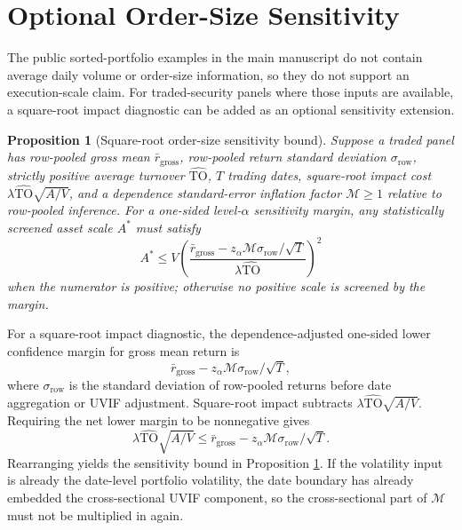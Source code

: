 \documentclass[12pt,a4paper]{article}
\newtheorem{proposition}{Proposition}
\begin{document}
\section{Optional Order-Size Sensitivity}

The public sorted-portfolio examples in the main manuscript do not
contain average daily volume or order-size information, so they do not
support an execution-scale claim.  For traded-security panels where those inputs
are available, a square-root impact diagnostic can be added as an
optional sensitivity extension.

\begin{proposition}[Square-root order-size sensitivity bound]
\label{prop:order-size-frontier}
Suppose a traded panel has row-pooled gross mean \(\bar r_{\mathrm{gross}}\),
row-pooled return standard deviation \(\sigma_{\mathrm{row}}\),
strictly positive average turnover \(\widehat{\mathrm{TO}}\), \(T\)
trading dates, square-root impact cost
\(\lambda \widehat{\mathrm{TO}}\sqrt{A/V}\), and a dependence
standard-error inflation factor \(\mathcal M\ge 1\) relative to
row-pooled inference.
For a one-sided level-\(\alpha\) sensitivity margin, any statistically
screened asset scale \(A^*\) must satisfy
\begin{equation}
  A^*
  \le
  V\left(
    \frac{\bar r_{\mathrm{gross}}
      -z_{\alpha}\mathcal M\sigma_{\mathrm{row}}/\sqrt{T}}
         {\lambda \widehat{\mathrm{TO}}}
  \right)^2
  \label{eq:order-size-frontier}
\end{equation}
when the numerator is positive; otherwise no positive scale is screened
by the margin.
\end{proposition}

For a square-root impact diagnostic, the dependence-adjusted one-sided
lower confidence margin for gross mean return is
\[
  \bar r_{\mathrm{gross}}
  - z_{\alpha}\mathcal M\sigma_{\mathrm{row}}/\sqrt{T},
\]
where \(\sigma_{\mathrm{row}}\) is the standard deviation of row-pooled
returns before date aggregation or UVIF adjustment.  Square-root impact
subtracts \(\lambda\widehat{\mathrm{TO}}\sqrt{A/V}\).  Requiring the net lower
margin to be nonnegative gives
\[
  \lambda\widehat{\mathrm{TO}}\sqrt{A/V}
  \le
  \bar r_{\mathrm{gross}}
  - z_{\alpha}\mathcal M\sigma_{\mathrm{row}}/\sqrt{T}.
\]
Rearranging yields the sensitivity bound in Proposition
\ref{prop:order-size-frontier}.  If
the volatility input is already the date-level portfolio volatility, the
date boundary has already embedded the cross-sectional UVIF component,
so the cross-sectional part of \(\mathcal M\) must not be multiplied in
again.
\end{document}
